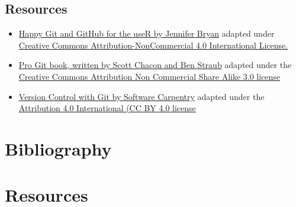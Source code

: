 \documentclass[]{book}
\providecommand{\tightlist}{%
  \setlength{\itemsep}{0pt}\setlength{\parskip}{0pt}}
\begin{document}
\hypertarget{resources}{%
\section{Resources}\label{resources}}

\begin{itemize}
\tightlist
\item
  \href{http://happygitwithr.com/rmd-test-drive.html}{Happy Git and GitHub for the useR by Jennifer Bryan} adapted under \href{https://creativecommons.org/licenses/by/4.0/}{Creative Commons Attribution-NonCommercial 4.0 International License.}
\item
  \href{https://git-scm.com/book/en/v2}{Pro Git book, written by Scott Chacon and Ben Straub} adapted under the \href{https://creativecommons.org/licenses/by/3.0/}{Creative Commons Attribution Non Commercial Share Alike 3.0 license}
\item
  \href{http://swcarpentry.github.io/git-novice/}{Version Control with Git by Software Carpentry} adapted under the \href{https://creativecommons.org/licenses/by/4.0/}{Attribution 4.0 International (CC BY 4.0 license}
\end{itemize}

\hypertarget{bibliography}{%
\chapter{Bibliography}\label{bibliography}}

\hypertarget{resources}{%
\chapter{Resources}\label{resources}}
\end{document}
